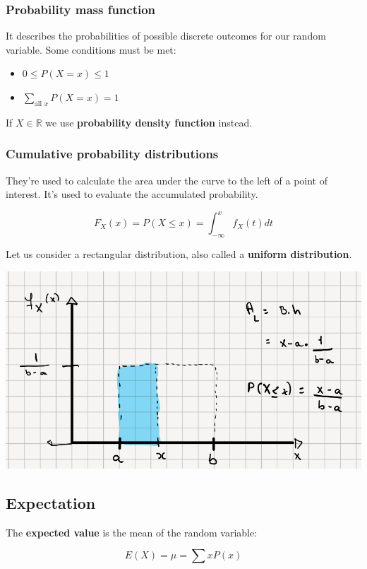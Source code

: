 \documentclass[12pt]{book}
\theoremstyle{definition}
\begin{document}
\subsubsection{Probability mass function} 
It describes the probabilities of possible discrete outcomes for our random variable. Some conditions must be met:
\begin{itemize}
    \item $0 \leq P(X = x) \leq 1$
    \item $\sum_{\text{all } x} P(X = x) = 1$
\end{itemize}

If $X \in \mathbb{R}$ we use \textbf{probability density function} instead.

\subsubsection{Cumulative probability distributions}
They're used to calculate the area under the curve to the left of a point of interest. It's used to evaluate the accumulated probability.

\[
    F_X(x) = P(X \leq x) = \int_{- \infty}^{x} f_X(t) dt
\]

Let us consider a rectangular distribution, also called a \textbf{uniform distribution}.

\begin{center}
    \includegraphics[scale=0.5]{../assets/cdf.png}
\end{center}


\subsection{Expectation}
The \textbf{expected value} is the mean of the random variable:

\[
    E(X) = \mu = \sum xP(x)
\]
\end{document}
